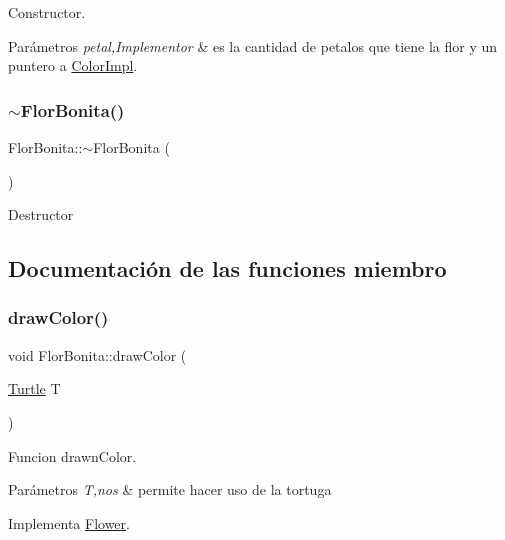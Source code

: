 Constructor. 
\begin{DoxyParams}{Parámetros}
{\em petal,Implementor} & es la cantidad de petalos que tiene la flor y un puntero a \hyperlink{classColorImpl}{Color\+Impl}. \\
\hline
\end{DoxyParams}
\mbox{\label{classFlorBonita_ada709e8050834cb8d988b5ba1bc558dc}} 
\subsubsection{\texorpdfstring{$\sim$\+Flor\+Bonita()}{~FlorBonita()}}
{\footnotesize\ttfamily Flor\+Bonita\+::$\sim$\+Flor\+Bonita (\begin{DoxyParamCaption}{ }\end{DoxyParamCaption})}

Destructor 

\subsection{Documentación de las funciones miembro}
\mbox{\label{classFlorBonita_a22345f27b2f33479d5d5b89cd7add93b}} 
\subsubsection{\texorpdfstring{draw\+Color()}{drawColor()}}
{\footnotesize\ttfamily void Flor\+Bonita\+::draw\+Color (\begin{DoxyParamCaption}\item[{\hyperlink{classTurtle}{Turtle}}]{T }\end{DoxyParamCaption})\hspace{0.3cm}{\ttfamily [virtual]}}

Funcion drawn\+Color. 
\begin{DoxyParams}{Parámetros}
{\em T,nos} & permite hacer uso de la tortuga \\
\hline
\end{DoxyParams}


Implementa \hyperlink{classFlower_a23dd402c7227bf81c42d7e57772c15bf}{Flower}.

